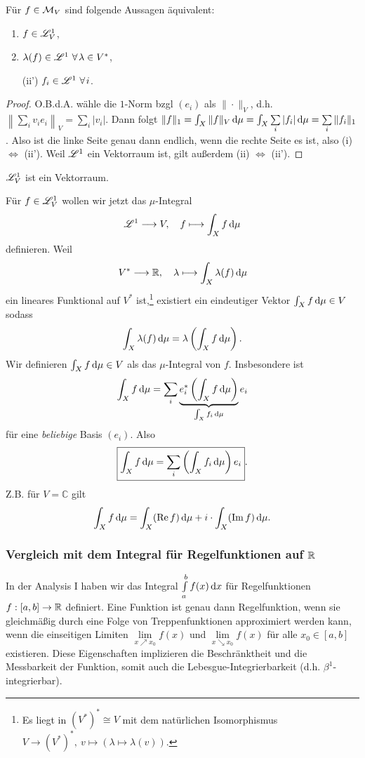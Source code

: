 \begin{lemma}
\begin{mdframed}
Für $f\in \mathcal{M}_V$ sind folgende Aussagen äquivalent:
\begin{enumerate}
\item $f\in \mathscr{L}_V^1$,
\item $\lambda(f)\in \LL^1 \ \forall \lambda \in V^*$,
\item[(ii')] $f_i \in \LL^1 \ \forall i$.
\end{enumerate}
\end{mdframed}
\begin{proof}
O.B.d.A. wähle die $1$-Norm bzgl $(e_i)$ als $\|\cdot\|_V$, d.h. $\left\|\sum\limits_i v_ie_i\right\|_V = \sum\limits_i |v_i|$. Dann folgt $\|f\|_1=\int_X \|f\|_V \, \mathrm{d}\mu = \int_X \sum\limits_i |f_i| \, \mathrm{d} \mu=\sum\limits_i \|f_i\|_1$. Also ist die linke Seite genau dann endlich, wenn die rechte Seite es ist, also (i)$\iff$ (ii'). Weil $\mathscr{L}^1$ ein Vektorraum ist, gilt außerdem (ii) $\iff$ (ii').
\end{proof}
\end{lemma}

\begin{korollar}
\begin{mdframed}
$\mathscr{L}^1_V$ ist ein Vektorraum.
\end{mdframed}
\end{korollar}
Für $f\in \mathscr{L}^1_V$ wollen wir jetzt das $\mu$-Integral $$\mathscr{L}^1  \longrightarrow V, \quad f\longmapsto \int_X f \, \mathrm{d} \mu$$ definieren. Weil
\begin{equation*}
V^*  \longrightarrow \mathbb{R}, \quad
\lambda  \longmapsto \int_X\lambda(f)\, \mathrm{d}\mu
\end{equation*}
ein lineares Funktional auf $V^*$ ist,\footnote{Es liegt in $ {(V^*)^* \cong V}$ mit dem natürlichen Isomorphismus $V\to (V^*)^*,\ v \mapsto (\lambda \mapsto \lambda(v))$.} existiert ein eindeutiger Vektor $\int_X f \, \mathrm{d}\mu \in V$ sodass
$$
\int_X \lambda(f)\, \mathrm{d}\mu = \lambda \left(\int_X f\, \mathrm{d}\mu\right).
$$
Wir definieren $\int_X f \, \mathrm{d}\mu \in V$ als das $\mu$-Integral von $f$. Insbesondere ist
$$
\int_X f \, \mathrm{d} \mu = \sum_i \underbrace{e_i^* \left(\int_X f \, \mathrm{d} \mu\right)}_{\int_X f_i\, \mathrm{d}\mu} e_i
$$
für eine \emph{beliebige} Basis $(e_i)$. Also
$$
\boxed{\int_Xf\, \mathrm{d}\mu =\sum\limits_i \left( \int_X f_i\, \mathrm{d}\mu\right) e_i}.
$$
Z.B. für $V=\mathbb{C}$ gilt $$\int_X f\, \mathrm{d}\mu = \int_X (\operatorname{Re} f)\, \mathrm{d}\mu +i \cdot \int_X (\operatorname{Im} f)\, \mathrm{d}\mu.$$
\vspace{0.4pc}
\subsubsection{Vergleich mit dem Integral für Regelfunktionen auf $\mathbb{R}$}
In der Analysis I haben wir das Integral $\int\limits_a^b f(x)\, \mathrm{d} x$ für Regelfunktionen $f:[a,b]\to \mathbb{R}$ definiert. Eine Funktion ist genau dann Regelfunktion, wenn sie gleichmäßig durch eine Folge von Treppenfunktionen approximiert werden kann, wenn die einseitigen Limiten $\lim\limits_{x\nearrow x_0}f(x)$ und $\lim\limits_{x\searrow x_0}f(x)$ für alle $x_0 \in [a,b]$ existieren. Diese Eigenschaften implizieren die Beschränktheit und die Messbarkeit der Funktion, somit auch die Lebesgue-Integrierbarkeit (d.h. $\beta^1$-integrierbar).

